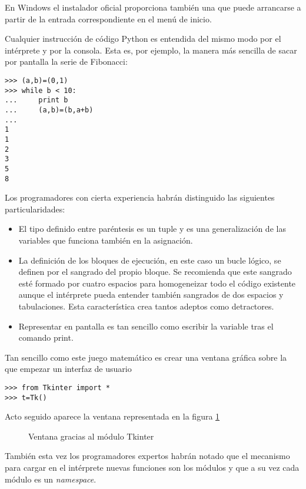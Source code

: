 \documentclass[a4paper,10pt]{article}
\begin{document}
En Windows el instalador oficial proporciona también una que puede
arrancarse a partir de la entrada correspondiente en el menú de
inicio.

Cualquier instrucción de código Python es entendida del mismo modo por
el intérprete y por la consola. Esta es, por ejemplo, la manera más
sencilla de sacar por pantalla la serie de Fibonacci:

\begin{lstlisting}
>>> (a,b)=(0,1)
>>> while b < 10:
...     print b
...     (a,b)=(b,a+b)
...
1
1
2
3
5
8
\end{lstlisting}

Los programadores con cierta experiencia habrán distinguido las
siguientes particularidades:

\begin{itemize}
\item El tipo definido entre paréntesis es un tuple y es una
  generalización de las variables que funciona también en la
  asignación.
\item La definición de los bloques de ejecución, en este caso un bucle
  lógico, se definen por el sangrado del propio bloque. Se recomienda
  que este sangrado esté formado por cuatro espacios para homogeneizar
  todo el código existente aunque el intérprete pueda entender también
  sangrados de dos espacios y tabulaciones. Esta característica crea
  tantos adeptos como detractores.
\item Representar en pantalla es tan sencillo como escribir la
  variable tras el comando print.
\end{itemize}

Tan sencillo como este juego matemático es crear una ventana gráfica
sobre la que empezar un interfaz de usuario

\begin{lstlisting}
>>> from Tkinter import *
>>> t=Tk()
\end{lstlisting}

Acto seguido aparece la ventana representada en la figura \ref{fig:tk}

\begin{figure}[h!]
\label{fig:tk}
  \centering
  \caption{Ventana gracias al módulo Tkinter}
\end{figure}

También esta vez los programadores expertos habrán notado que el
mecanismo para cargar en el intérprete nuevas funciones son los
módulos y que a su vez cada módulo es un \emph{namespace}.
\end{document}
